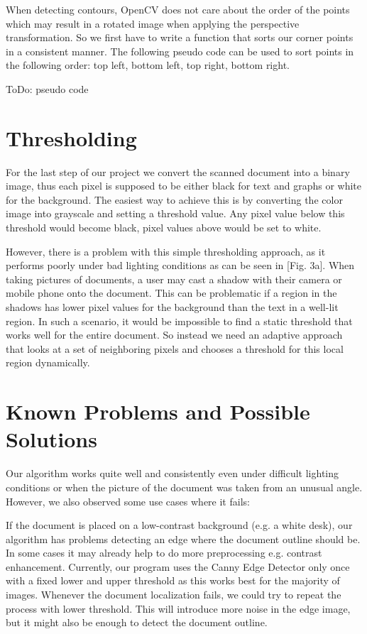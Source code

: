 \documentclass[bibliography=totoc]{scrartcl}
\begin{document}
	When detecting contours, OpenCV does not care about the order of the points which may result in a rotated image when applying the perspective transformation.
	So we first have to write a function that sorts our corner points in a consistent manner.
	The following pseudo code can be used to sort points in the following order: top left, bottom left, top right, bottom right.

	ToDo: pseudo code

	
	\section{Thresholding}
	For the last step of our project we convert the scanned document into a binary image, thus each pixel is supposed to be either black for text and graphs or white for the background.
	The easiest way to achieve this is by converting the color image into grayscale and setting a threshold value. 
	Any pixel value below this threshold would become black, pixel values above would be set to white.

	However, there is a problem with this simple thresholding approach, as it performs poorly under bad lighting conditions as can be seen in [Fig. 3a].
	When taking pictures of documents, a user may cast a shadow with their camera or mobile phone onto the document. 
	This can be problematic if a region in the shadows has lower pixel values for the background than the text in a well-lit region.
	In such a scenario, it would be impossible to find a static threshold that works well for the entire document.
	So instead we need an adaptive approach that looks at a set of neighboring pixels and chooses a threshold for this local region dynamically.

	\section{Known Problems and Possible Solutions}
	Our algorithm works quite well and consistently even under difficult lighting conditions or when the picture of the document was taken from an unusual angle.
	However, we also observed some use cases where it fails:
	
	If the document is placed on a low-contrast background (e.g. a white desk), our algorithm has problems detecting an edge where the document outline should be.
	In some cases it may already help to do more preprocessing e.g. contrast enhancement.
	Currently, our program uses the Canny Edge Detector only once with a fixed lower and upper threshold as this works best for the majority of images.
	Whenever the document localization fails, we could try to repeat the process with lower threshold. 
	This will introduce more noise in the edge image, but it might also be enough to detect the document outline.
\end{document}
